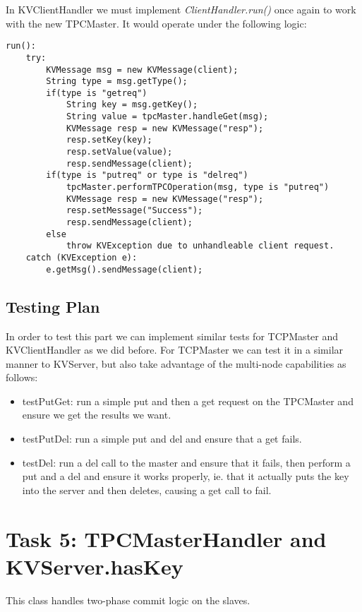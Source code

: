 \documentclass{article}
\begin{document}
In KVClientHandler we must implement \textit{ClientHandler.run()} once again to work with the new TPCMaster.
It would operate under the following logic:
\begin{verbatim}
run():
    try:
        KVMessage msg = new KVMessage(client);
        String type = msg.getType();
        if(type is "getreq")
            String key = msg.getKey();
            String value = tpcMaster.handleGet(msg);
            KVMessage resp = new KVMessage("resp");
            resp.setKey(key);
            resp.setValue(value);
            resp.sendMessage(client);
        if(type is "putreq" or type is "delreq")
            tpcMaster.performTPCOperation(msg, type is "putreq")
            KVMessage resp = new KVMessage("resp");
            resp.setMessage("Success");
            resp.sendMessage(client);
        else
            throw KVException due to unhandleable client request.
    catch (KVException e):
        e.getMsg().sendMessage(client);
\end{verbatim}

\subsection*{Testing Plan}

In order to test this part we can implement similar tests for TCPMaster and KVClientHandler as we
did before. For TCPMaster we can test it in a similar manner to KVServer, but also take advantage of the
multi-node capabilities as follows:
\begin{itemize}
\item testPutGet: run a simple put and then a get request on the TPCMaster and ensure we get the results we want.
\item testPutDel: run a simple put and del and ensure that a get fails.
\item testDel: run a del call to the master and ensure that it fails, then perform a put and a del and ensure it works properly, 
ie. that it actually puts the key into the server and then deletes, causing a get call to fail.
\end{itemize}

\section*{Task 5: TPCMasterHandler and KVServer.hasKey}
This class handles two-phase commit logic on the slaves.
\end{document}
